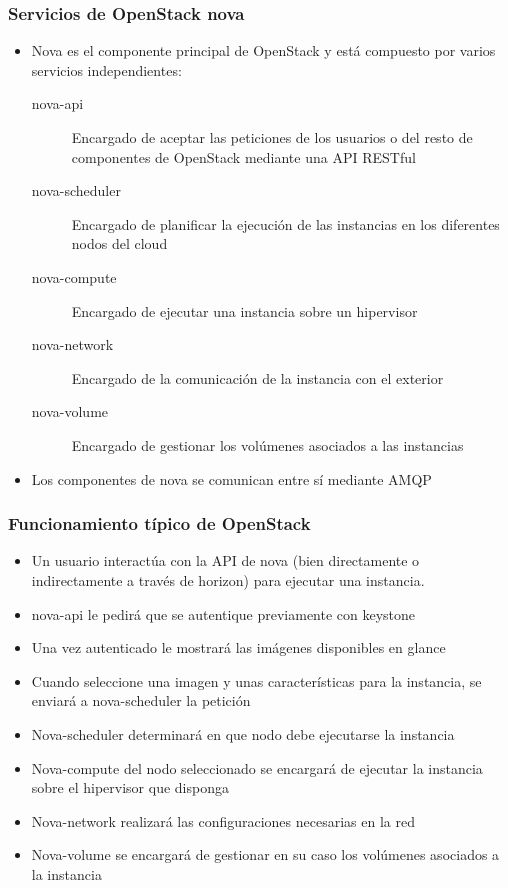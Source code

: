 \documentclass{beamer}
\begin{document}
\begin{frame}
  \frametitle{Servicios de OpenStack nova}
  \begin{itemize}
  \item Nova es el componente principal de OpenStack y está compuesto por varios
    servicios independientes:
    \begin{description}
    \item[nova-api] Encargado de aceptar las peticiones de los usuarios o del
      resto de componentes de OpenStack mediante una API RESTful
    \item[nova-scheduler] Encargado de planificar la ejecución de las instancias
      en los diferentes nodos del cloud
    \item[nova-compute] Encargado de ejecutar una instancia sobre un hipervisor
    \item[nova-network] Encargado de la comunicación de la instancia con el
      exterior
    \item[nova-volume] Encargado de gestionar los volúmenes asociados a las
      instancias
    \end{description}
  \item Los componentes de nova se comunican entre sí mediante AMQP
  \end{itemize}
\end{frame}

\begin{frame}
  \frametitle{Funcionamiento típico de OpenStack}
  \begin{itemize}
  \item Un usuario interactúa con la API de nova (bien directamente o
    indirectamente a través de horizon) para ejecutar una instancia.
  \item nova-api le pedirá que se autentique previamente con keystone
  \item Una vez autenticado le mostrará las imágenes disponibles en glance
  \item Cuando seleccione una imagen y unas características para la instancia,
    se enviará a nova-scheduler la petición
  \item Nova-scheduler determinará en que nodo debe ejecutarse la instancia
  \item Nova-compute del nodo seleccionado se encargará de ejecutar la instancia
    sobre el hipervisor que disponga
  \item Nova-network realizará las configuraciones necesarias en la red
  \item Nova-volume se encargará de gestionar en su caso los volúmenes asociados
    a la instancia
  \end{itemize}
\end{frame}
\end{document}
